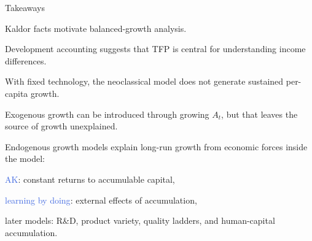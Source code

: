 \documentclass[aspectratio=169,xcolor=dvipsnames]{beamer}
\let\tempone\itemize
\let\temptwo\enditemize
\renewenvironment{itemize}{\tempone\addtolength{\itemsep}{\fill}}{\temptwo}
\let\tempa\enumerate
\let\tempb\endenumerate
\renewenvironment{enumerate}{\tempa\addtolength{\itemsep}{\fill}}{\tempb}
\providecommand{\blue}[1]{\textcolor{RoyalBlue}{#1}}
\begin{document}
\begin{frame}{Takeaways}
\small
\begin{enumerate}
    \item Kaldor facts motivate balanced-growth analysis.
    \item Development accounting suggests that TFP is central for understanding income differences.
    \item With fixed technology, the neoclassical model does not generate sustained per-capita growth.
    \item Exogenous growth can be introduced through growing $A_t$, but that leaves the source of growth unexplained.
    \item Endogenous growth models explain long-run growth from economic forces inside the model:
    \begin{itemize}
        \item \blue{AK}: constant returns to accumulable capital,
        \item \blue{learning by doing}: external effects of accumulation,
        \item later models: R\&D, product variety, quality ladders, and human-capital accumulation.
    \end{itemize}
\end{enumerate}
\end{frame}
\end{document}
